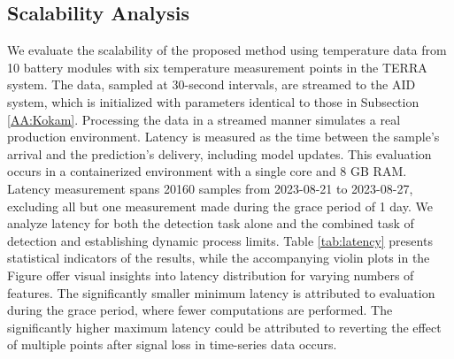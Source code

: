 \subsection{Scalability Analysis}\label{AA:Scalability}

We evaluate the scalability of the proposed method using temperature data from 10 battery modules with six temperature measurement points in the TERRA system. The data, sampled at 30-second intervals, are streamed to the AID system, which is initialized with parameters identical to those in Subsection \ref{AA:Kokam}. Processing the data in a streamed manner simulates a real production environment. Latency is measured as the time between the sample's arrival and the prediction's delivery, including model updates. This evaluation occurs in a containerized environment with a single core and 8 GB RAM. Latency measurement spans 20160 samples from 2023-08-21 to 2023-08-27, excluding all but one measurement made during the grace period of 1 day. We analyze latency for both the detection task alone and the combined task of detection and establishing dynamic process limits. Table \ref{tab:latency} presents statistical indicators of the results, while the accompanying violin plots in the Figure offer visual insights into latency distribution for varying numbers of features. The significantly smaller minimum latency is attributed to evaluation during the grace period, where fewer computations are performed. The significantly higher maximum latency could be attributed to reverting the effect of multiple points after signal loss in time-series data occurs.

